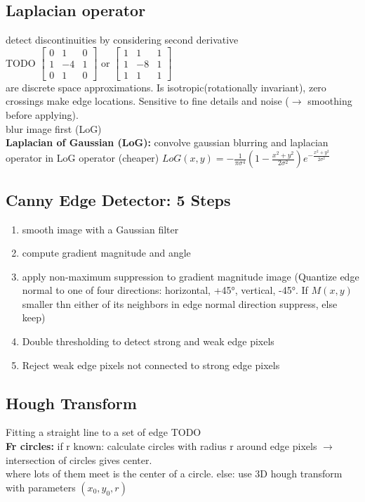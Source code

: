 \subsection*{Laplacian operator}
detect discontinuities by considering second derivative\\ TODO
$\begin{bmatrix}
0 & 1 & 0\\
1 & -4 & 1\\
0 & 1 & 0
\end{bmatrix}$ or 
$\begin{bmatrix}
1 & 1 & 1\\
1 & -8 & 1\\
1 & 1 & 1
\end{bmatrix}$\\
are discrete space approximations. Is isotropic(rotationally invariant), zero crossings make edge locations. Sensitive to fine details and noise ($\rightarrow$ smoothing before applying).\\ blur image first (LoG)\\
\textbf{Laplacian of Gaussian (LoG):} convolve gaussian blurring and laplacian operator in LoG operator (cheaper) $LoG(x, y) = -\frac{1}{\pi \sigma^{4}} (1 - \frac{x^{2} + y^{2}}{2\sigma^{2}}) e^{-\frac{x^{2} + y^{2}}{2\sigma^{2}}}$\\
\subsection*{Canny Edge Detector: 5 Steps}
\begin{enumerate}
    \item smooth image with a Gaussian filter
    \item compute gradient magnitude and angle
    \item apply non-maximum suppression to gradient magnitude image (Quantize edge normal to one of four directions: horizontal, +45°, vertical, -45°. If $M(x, y)$ smaller thn either of its neighbors in edge normal direction suppress, else keep)
    \item Double thresholding to detect strong and weak edge pixels
    \item Reject weak edge pixels not connected to strong edge pixels
\end{enumerate}
\subsection*{Hough Transform}
Fitting a straight line to a set of edge TODO\\
\textbf{Fr circles:} if r known: calculate circles with radius r around edge pixels $\rightarrow$ intersection of circles gives center.\\ where lots of them meet is the center of a circle. else: use 3D hough transform with parameters $(x_0, y_0, r)$\\
